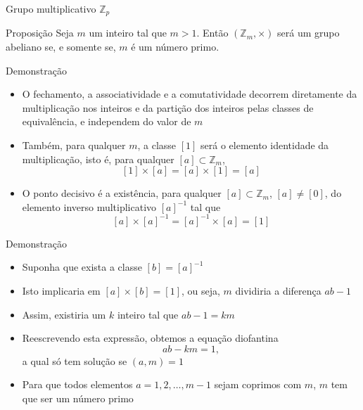 \begin{frame}[fragile]{Grupo multiplicativo $\mathbb{Z}_p$}

    \begin{block}{Proposição}
        Seja $m$ um inteiro tal que $m > 1$. Então $(\mathbb{Z}_m, \times)$ será um grupo 
            abeliano se, e somente se, $m$ é um número primo.
    \end{block}

\end{frame}

\begin{frame}[fragile]{Demonstração}

    \begin{itemize}
        \item O fechamento, a associatividade e a comutatividade decorrem diretamente da 
            multiplicação nos inteiros e da partição dos inteiros pelas classes de equivalência,
            e independem do valor de $m$

        \item Também, para qualquer $m$, a classe $[1]$ será o elemento identidade da 
            multiplicação, isto é, para qualquer $[a]\subset \mathbb{Z}_m$,
        $$
            [1]\times [a] = [a]\times [1] = [a]
        $$

        \item O ponto decisivo é a existência, para qualquer $[a]\subset \mathbb{Z}_m$, 
            $[a]\neq [0]$,  do elemento inverso multiplicativo $[a]^{-1}$ tal que
        $$
            [a]\times [a]^{-1} = [a]^{-1}\times [a] = [1]
        $$
    \end{itemize}

\end{frame}

\begin{frame}[fragile]{Demonstração}

    \begin{itemize}
        \item Suponha que exista a classe $[b] = [a]^{-1}$

        \item Isto implicaria em $[a]\times [b] = [1]$, ou seja, $m$ dividiria a diferença $ab - 1$ 

        \item Assim, existiria um $k$ inteiro tal que $ab - 1 = km$

        \item Reescrevendo esta expressão, obtemos a equação diofantina
        $$
            ab - km = 1,
        $$
        a qual só tem solução se $(a, m) = 1$

        \item Para que todos elementos $a = 1, 2, \ldots, m - 1$ sejam coprimos com $m$, $m$ tem que
            ser um número primo 
    \end{itemize}

\end{frame}

